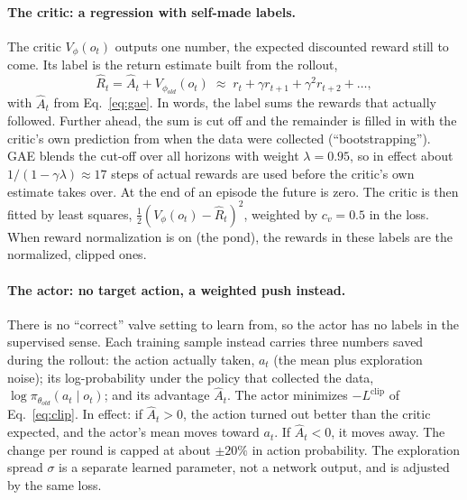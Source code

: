 \paragraph{The critic: a regression with self-made labels.} The critic
$V_\phi(o_t)$ outputs one number, the expected discounted reward still to
come. Its label is the return estimate built from the rollout,
\[
\hat R_t=\hat A_t+V_{\phi_{old}}(o_t)\;\approx\; r_t+\gamma r_{t+1}+\gamma^2 r_{t+2}+\dots,
\]
with $\hat A_t$ from Eq.~\eqref{eq:gae}. In words, the label sums the
rewards that actually followed. Further ahead, the sum is cut off and the
remainder is filled in with the critic's own prediction from when the data
were collected (``bootstrapping''). GAE blends the cut-off over all horizons
with weight $\lambda=0.95$, so in effect about $1/(1-\gamma\lambda)\approx17$
steps of actual rewards are used before the critic's own estimate takes
over. At the end of an episode the future is zero. The critic is then
fitted by least squares, $\tfrac12(V_\phi(o_t)-\hat R_t)^2$, weighted by
$c_v=0.5$ in the loss. When reward normalization is on (the pond), the
rewards in these labels are the normalized, clipped ones.

\paragraph{The actor: no target action, a weighted push instead.} There is
no ``correct'' valve setting to learn from, so the actor has no labels in
the supervised sense. Each training sample instead carries three numbers
saved during the rollout: the action actually taken, $a_t$ (the mean plus
exploration noise); its log-probability under the policy that collected the
data, $\log\pi_{\theta_{old}}(a_t\mid o_t)$; and its advantage $\hat A_t$.
The actor minimizes $-L^{\mathrm{clip}}$ of Eq.~\eqref{eq:clip}. In effect:
if $\hat A_t>0$, the action turned out better than the critic expected, and
the actor's mean moves toward $a_t$. If $\hat A_t<0$, it moves away. The
change per round is capped at about $\pm20\%$ in action probability. The
exploration spread $\sigma$ is a separate learned parameter, not a network
output, and is adjusted by the same loss.

